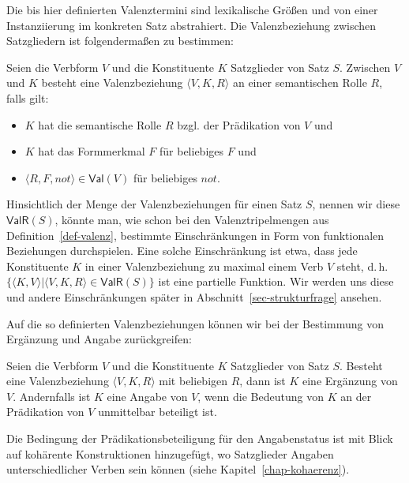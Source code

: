 Die bis hier definierten Valenztermini sind lexikalische Grö\ss en und von einer Instanziierung im konkreten Satz abstrahiert. Die Valenzbeziehung zwischen Satzgliedern ist folgenderma\ss en zu bestimmen:

\begin{definition}[Valenzbeziehung] \label{def:valenzbeziehung}
Seien die Verbform $V$ und die Konstituente $K$ \linebreak Satzglieder von Satz $S$. Zwischen $V$ und $K$ besteht eine Valenzbeziehung $\langle V,K,R \rangle$ an einer semantischen Rolle $R$, falls gilt:
\begin{itemize}
\item $K$ hat die semantische Rolle $R$ bzgl. der Prädikation von $V$  und 
\item $K$ hat das Formmerkmal $F$ für beliebiges $F$ und
\item $\langle R,F,not \rangle \in \mathsf{Val}(V)$ für beliebiges $not$.
\end{itemize}
\end{definition}
Hinsichtlich der Menge der Valenzbeziehungen für einen Satz $S$, nennen wir diese $\mathsf{ValR}(S)$, könnte man, wie schon bei den Valenztripelmengen aus Definition~\ref{def-valenz}, bestimmte Einschränkungen in Form von funktionalen Beziehungen durchspielen. Eine solche Einschränkung ist etwa, dass jede Konstituente $K$ in einer Valenzbeziehung zu maximal einem Verb $V$ steht, d.\,h.\ $\{\langle K,V \rangle | \langle V,K,R \rangle \in \mathsf{ValR}(S) \}$ ist eine partielle Funktion. Wir werden uns diese und andere Einschränkungen später in Abschnitt~\ref{sec-strukturfrage} ansehen. 

Auf die so definierten Valenzbeziehungen können wir bei der Bestimmung von Ergänzung und Angabe zurückgreifen:
\begin{definition}
Seien die Verbform $V$ und die Konstituente $K$ Satzglieder von Satz $S$. Besteht eine Valenzbeziehung $\langle V,K,R\rangle$ mit beliebigen $R$, dann ist $K$ eine Ergänzung von $V$. Andernfalls ist $K$ eine Angabe von $V$, wenn die Bedeutung von $K$ an der Prädikation von $V$ unmittelbar beteiligt ist.
\end{definition}
Die Bedingung der Prädikationsbeteiligung für den Angabenstatus ist mit Blick auf kohärente Konstruktionen hinzugefügt, wo Satzglieder Angaben unterschiedlicher Verben sein können (siehe Kapitel~\ref{chap-kohaerenz}).

